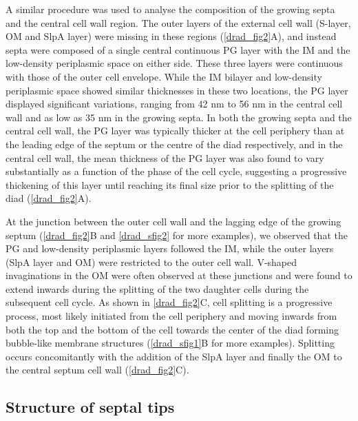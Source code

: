 A similar procedure was used to analyse the composition of the growing septa and the central cell wall region.
The outer layers of the external cell wall (S-layer, OM and SlpA layer) were missing in these regions (\autoref{drad_fig2}A), and instead septa were composed of a single central continuous PG layer with the IM and the low-density periplasmic space on either side.
These three layers were continuous with those of the outer cell envelope.
While the IM bilayer and low-density periplasmic space showed similar thicknesses in these two locations, the PG layer displayed significant variations, ranging from 42 nm to 56 nm in the central cell wall and as low as 35 nm in the growing septa.
In both the growing septa and the central cell wall, the PG layer was typically thicker at the cell periphery than at the leading edge of the septum or the centre of the diad respectively, and in the central cell wall, the mean thickness of the PG layer was also found to vary substantially as a function of the phase of the cell cycle, suggesting a progressive thickening of this layer until reaching its final size prior to the splitting of the diad (\autoref{drad_fig2}A).

At the junction between the outer cell wall and the lagging edge of the growing septum (\autoref{drad_fig2}B and \autoref{drad_sfig2} for more examples), we observed that the PG and low-density periplasmic layers followed the IM, while the outer layers (SlpA layer and OM) were restricted to the outer cell wall.
V-shaped invaginations in the OM were often observed at these junctions and were found to extend inwards during the splitting of the two daughter cells during the subsequent cell cycle.
As shown in \autoref{drad_fig2}C, cell splitting is a progressive process, most likely initiated from the cell periphery and moving inwards from both the top and the bottom of the cell towards the center of the diad forming bubble-like membrane structures (\autoref{drad_sfig1}B for more examples).
Splitting occurs concomitantly with the addition of the SlpA layer and finally the OM to the central septum cell wall (\autoref{drad_fig2}C).

\FloatBarrier

\subsection{Structure of septal tips}

